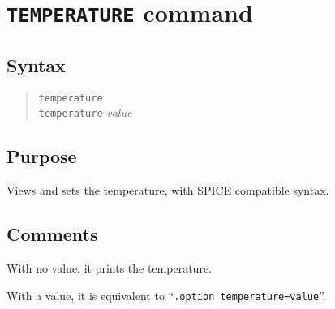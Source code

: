 %
%
%
%
\section{{\tt TEMPERATURE} command}
\subsection{Syntax}
\begin{verse}
{\tt temperature}\\
{\tt temperature} {\it value}
\end{verse}
\subsection{Purpose}

Views and sets the temperature, with SPICE compatible syntax.
\subsection{Comments}

With no value, it prints the temperature.

With a value, it is equivalent to ``{\tt .option temperature=value}''.
